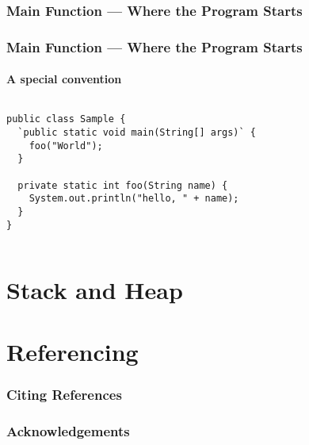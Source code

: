 \documentclass[en, 11pt, xcolor=dvipsnames]{beamer}
\begin{document}
\subsubsection{Main Function --- Where the Program Starts}
\begin{frame}[fragile]
	\frametitle{Main Function --- Where the Program Starts}
	\framesubtitle{A special convention}

	\begin{columns}[c]
		\begin{column}{0.9\textwidth}

			\begin{lstlisting}[style=Java]
public class Sample {
  `public static void main(String[] args)` {
    foo("World");
  }

  private static int foo(String name) {
    System.out.println("hello, " + name);
  }
}
\end{lstlisting}

		\end{column}
	\end{columns}

\end{frame}


\section{Stack and Heap}
\begin{frame}

\end{frame}


\QApage


\section{Referencing}

\begin{frame}
	\frametitle{Citing References}

	\bigskip %

\end{frame}




\begin{frame}
	\frametitle{Acknowledgements}

	\begin{columns}[t] %
		\begin{column}{0.45\textwidth} %
		\end{column}
		\begin{column}{0.5\textwidth} %
		\end{column}
	\end{columns}
\end{frame}
\end{document}
